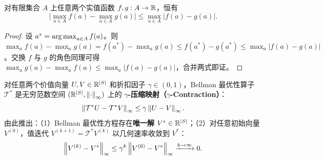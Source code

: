 \begin{lemma}\label{lem:max-nonexpansive}
对有限集合 $A$ 上任意两个实值函数 $f, g: A \to \mathbb{R}$，恒有
\[
  \Big|\max_{a \in A} f(a) - \max_{a \in A} g(a)\Big| \le \max_{a \in A} |f(a) - g(a)|.
\]
\end{lemma}
\begin{proof}
设 $a^* = \operatorname*{arg\,max}_{a\in A} f(a)$。则 $\max_a f(a) - \max_a g(a) = f(a^*) - \max_a g(a) \le f(a^*) - g(a^*) \le \max_a |f(a) - g(a)|$。交换 $f$ 与 $g$ 的角色同理可得 $\max_a g(a) - \max_a f(a) \le \max_a |f(a) - g(a)|$，合并两式即证。
\end{proof}

\begin{thmBox}
\begin{theorem}\label{thm:vi-contraction}
对任意两个价值向量 $U, V \in \mathbb{R}^{|S|}$ 和折扣因子 $\gamma \in (0, 1)$，Bellman 最优性算子 $\mathcal{T}^*$ 是无穷范数空间 $(\mathbb{R}^{|S|}, \left\|\cdot\right\|_\infty)$ 上的 \textbf{$\gamma$-压缩映射（$\gamma$-Contraction）}：
\begin{equation}\label{eq:contraction}
  \left\|\mathcal{T}^* U - \mathcal{T}^* V\right\|_\infty \le \gamma \left\|U - V\right\|_\infty.
\end{equation}
由此推出：（1）Bellman 最优性方程存在\textbf{唯一解} $V^* \in \mathbb{R}^{|S|}$；（2）对任意初始向量 $V^{(0)}$，值迭代 $V^{(k+1)} = \mathcal{T}^* V^{(k)}$ 以几何速率收敛到 $V^*$：
\begin{equation}\label{eq:vi-geom-rate}
  \left\|V^{(k)} - V^*\right\|_\infty \le \gamma^k \left\|V^{(0)} - V^*\right\|_\infty \xrightarrow{k \to \infty} 0.
\end{equation}
\end{theorem}
\end{thmBox}

